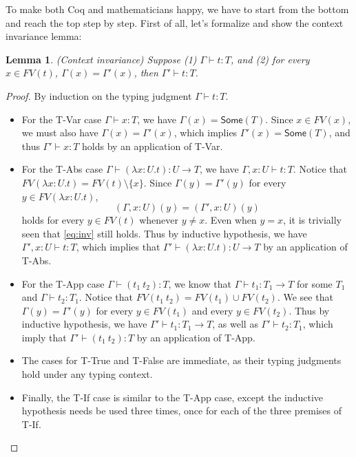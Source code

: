 \documentclass[11pt]{article}
\newtheorem{lemma}{Lemma}
\let\to\rightarrow
\newcommand{\Some}[1]{\textsf{Some}(#1)}
\begin{document}
To make both Coq and mathematicians happy, we have to start from the bottom and reach the top step by step.
First of all, let's formalize and show the context invariance lemma:
\begin{lemma}\label{thm:ori:inv}
    (Context invariance) Suppose (1) $\Gamma \vdash t:T$, and (2) for every $x\in FV(t)$, $\Gamma(x)=\Gamma'(x)$, then $\Gamma' \vdash t:T$.
\end{lemma}
\begin{proof}
    By induction on the typing judgment $\Gamma \vdash t:T$.
    \begin{itemize}
        \item For the T-Var case $\Gamma \vdash x:T$, we have $\Gamma(x)=\Some{T}$.
        Since $x \in FV(x)$, we must also have $\Gamma(x) = \Gamma'(x)$, which implies $\Gamma'(x)=\Some{T}$,
        and thus $\Gamma' \vdash x:T$ holds by an application of T-Var.
        \item For the T-Abs case $\Gamma \vdash (\lambda x:U.t):U \to T$, we have $\Gamma,x:U \vdash t:T$.
        Notice that $FV(\lambda x:U.t)=FV(t) \setminus \{x\}$.
        Since $\Gamma(y)=\Gamma'(y)$ for every $y\in FV(\lambda x:U.t)$, 
        \begin{equation}\label{eq:inv}
            (\Gamma,x:U)(y)=(\Gamma',x:U)(y)    
        \end{equation}
        holds for every $y\in FV(t)$ whenever $y \not=x$.
        Even when $y = x$, it is trivially seen that \cref{eq:inv} still holds.
        Thus by inductive hypothesis, we have $\Gamma',x:U \vdash t:T$, which implies that $\Gamma' \vdash (\lambda x:U.t): U \to T$ by an application of T-Abs.
        \item For the T-App case $\Gamma \vdash (t_1~t_2):T$, we know that $\Gamma \vdash t_1:T_1 \to T$ for some $T_1$ and $\Gamma \vdash t_2:T_1$.
        Notice that $FV(t_1~t_2)=FV(t_1) \cup FV(t_2)$.
        We see that $\Gamma(y)=\Gamma'(y)$ for every $y \in FV(t_1)$ and every $y \in FV(t_2)$.
        Thus by inductive hypothesis, we have $\Gamma' \vdash t_1:T_1 \to T$, as well as $\Gamma' \vdash t_2:T_1$, which imply that $\Gamma' \vdash (t_1~t_2): T$ by an application of T-App.
        \item The cases for T-True and T-False are immediate, as their typing judgments hold under any typing context.
        \item Finally, the T-If case is similar to the T-App case, except the inductive hypothesis needs be used three times, once for each of the three premises of T-If.
    \end{itemize}
\end{proof}
\end{document}
